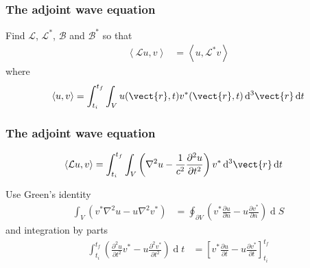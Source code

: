 \documentclass[12 pt, compress, handout, intlimits]{beamer}
\renewcommand{\d}{\operatorname{d}\!}
\renewcommand{\L}{\mathcal{L}}
\renewcommand{\B}{\mathcal{B}}
\newcommand{\inprod}[2]{\left\langle {#1}, {#2} \right\rangle}
\renewcommand{\L}{\mathcal{L}}
\begin{document}
\begin{frame}[fragile]
    \frametitle{The adjoint wave equation}

    Find $ \L $, $ \L^* $, $ \B $ and $ \B^* $ so that
    \begin{align*}
        \inprod{\L u}{v} &= \inprod{u}{\L^* v}
    \end{align*}
    where
    \begin{align*}
        \inprod{u}{v} = \int_{t_i}^{t_f} \int_V u(\vect{r}, t) v^*(\vect{r}, t) \d^3 \vect{r} \d t
    \end{align*}
    
\end{frame}


\begin{frame}[fragile]
    \frametitle{The adjoint wave equation}

    \vspace{-24pt}
    \begin{align*}
        \inprod{\L u}{v} &= \int_{t_i}^{t_f} \int_V \left( \nabla^2 u - \frac{1}{c^2} \frac{\partial^2 u}{\partial t^2} \right) v^* \d^3 \vect{r} \d t
    \end{align*}
    
    Use Green's identity
    \begin{align*}
        \int_V \left( v^* \nabla^2 u - u \nabla^2 v^* \right) &= \oint_{\partial V} \left( v^* \frac{\partial u}{\partial n} - u \frac{\partial v^*}{\partial n} \right) \d S
    \end{align*}
    and integration by parts
    \begin{align*}
        \int_{t_i}^{t_f} \left( \frac{\partial^2 u}{\partial t^2} v^* - u \frac{\partial^2 v^*}{\partial t^2} \right) \d t &= \left[ v^* \frac{\partial u}{\partial t} - u \frac{\partial v^*}{\partial t} \right]_{t_i}^{t_f}
    \end{align*}
\end{frame}
\end{document}

